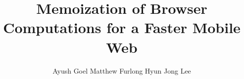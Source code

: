 \documentclass{ns-article-compact}
\begin{document}
\newcommand{\paraspace}{\vspace{0.02in}}
\newcommand{\parab}[1]{\paraspace\noindent{\bf #1} }
\newcommand{\parae}[1]{\paraspace\noindent{\em #1} }
\newcommand{\parabe}[1]{\paraspace\noindent{\bf \em #1} }

\newcommand{\system}{{\sc Pando}\xspace}
\newcommand{\pman}{Placement Manager\xspace}

\def\papertitle{ Memoization of Browser Computations for a Faster Mobile Web}

\title{\papertitle}

\author{Ayush Goel   Matthew Furlong    Hyun Jong Lee} %


\maketitle

\thispagestyle{empty}








\label{lastpage}

\clearpage



\clearpage
\appendix
\end{document}
